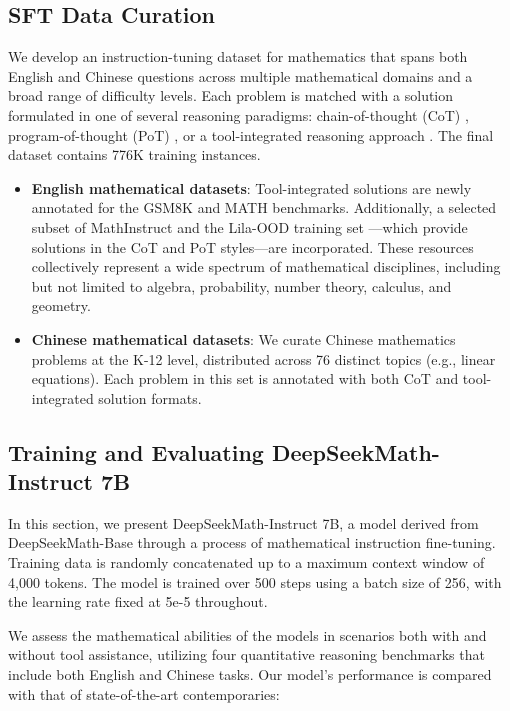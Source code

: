 \begin{itemize}[topsep=0pt]
\subsection{SFT Data Curation}

We develop an instruction-tuning dataset for mathematics that spans both English and Chinese questions across multiple mathematical domains and a broad range of difficulty levels. Each problem is matched with a solution formulated in one of several reasoning paradigms: chain-of-thought (CoT) \citep{cot}, program-of-thought (PoT) \citep{pot,pal}, or a tool-integrated reasoning approach \citep{tora}. The final dataset contains 776K training instances.

\begin{itemize}[topsep=0pt]
    \item \textbf{English mathematical datasets}: Tool-integrated solutions are newly annotated for the GSM8K and MATH benchmarks. Additionally, a selected subset of MathInstruct \citep{MathInstruct} and the Lila-OOD training set \citep{lila}—which provide solutions in the CoT and PoT styles—are incorporated. These resources collectively represent a wide spectrum of mathematical disciplines, including but not limited to algebra, probability, number theory, calculus, and geometry.
    \item \textbf{Chinese mathematical datasets}: We curate Chinese mathematics problems at the K-12 level, distributed across 76 distinct topics (e.g., linear equations). Each problem in this set is annotated with both CoT and tool-integrated solution formats.
\end{itemize}

\subsection{Training and Evaluating DeepSeekMath-Instruct 7B}

In this section, we present DeepSeekMath-Instruct 7B, a model derived from DeepSeekMath-Base through a process of mathematical instruction fine-tuning. Training data is randomly concatenated up to a maximum context window of 4,000 tokens. The model is trained over 500 steps using a batch size of 256, with the learning rate fixed at 5e-5 throughout.

We assess the mathematical abilities of the models in scenarios both with and without tool assistance, utilizing four quantitative reasoning benchmarks that include both English and Chinese tasks. Our model's performance is compared with that of state-of-the-art contemporaries:


\end{itemize}
